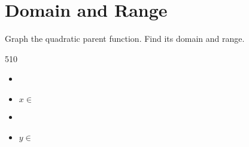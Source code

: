 \section{Domain and Range}

\myProblemsWithContent 
{
    Graph the quadratic parent function.
    Find its domain and range.\\
    \begin{minipage}{0.39\textwidth}
        \begin{myTikzpictureGrid}{0.25} {5}{10} 
        \end{myTikzpictureGrid}
    \end{minipage}
    \hfill
    \begin{minipage}{0.55\textwidth}
        \small
        \begin{itemize}[fullwidth,nosep]
            \item {}
            \item $x \in $ \gap{$(-\infty,\infty)$}
        \end{itemize}
        \vspace{1em}
        \begin{itemize}[fullwidth,nosep]
            \item {}
            \item $y \in $ \gap{$[0,\infty)$}
        \end{itemize}
    \end{minipage}
}
